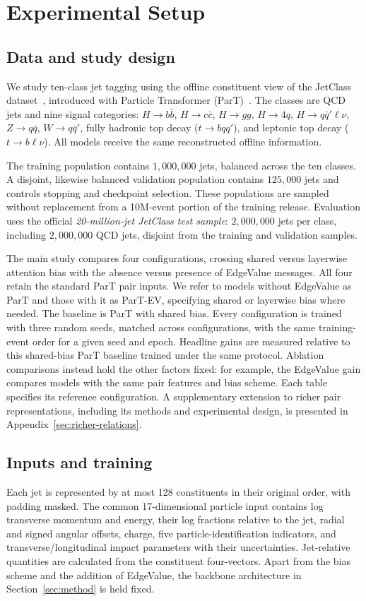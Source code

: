 \section{Experimental Setup}
\label{sec:experiments}

\subsection{Data and study design}
We study ten-class jet tagging using the offline constituent view of the
JetClass dataset~\citep{JetClass}, introduced with Particle Transformer
(ParT)~\citep{Qu2022ParticleTransformer}.
The classes are QCD jets and nine signal categories:
$H\to b\bar b$, $H\to c\bar c$, $H\to gg$, $H\to4q$, $H\to q\bar q'\ell\nu$,
$Z\to q\bar q$, $W\to q\bar q'$, fully hadronic top decay ($t\to bqq'$),
and leptonic top decay ($t\to b\ell\nu$).
All models receive the same reconstructed offline information.

The training population contains $1{,}000{,}000$ jets, balanced across the ten
classes. A disjoint, likewise balanced validation population contains
$125{,}000$ jets and controls stopping and checkpoint selection.
These populations are sampled without replacement from a 10M-event portion
of the training release. Evaluation uses the official
\emph{20-million-jet JetClass test sample}: $2{,}000{,}000$ jets per class, including
$2{,}000{,}000$ QCD jets, disjoint from the training and validation samples.

The main study compares four configurations, crossing shared versus layerwise
attention bias with the absence versus presence of EdgeValue messages.
All four retain the standard ParT pair inputs. We refer to models without
EdgeValue as ParT and those with it as ParT-EV, specifying shared or layerwise
bias where needed. The baseline is ParT with shared bias.
Every configuration is trained with three random seeds, matched across
configurations, with the same training-event order for a given seed and epoch.
Headline gains are measured relative to this shared-bias ParT baseline trained
under the same protocol. Ablation comparisons instead hold the other factors
fixed: for example, the EdgeValue gain compares models with the same pair
features and bias scheme. Each table specifies its reference configuration.
A supplementary extension to richer pair representations, including its
methods and experimental design, is presented in Appendix~\ref{sec:richer-relations}.

\subsection{Inputs and training}
\label{sec:training}
Each jet is represented by at most 128 constituents in their original order,
with padding masked. The common 17-dimensional particle input
contains log transverse momentum and energy, their log fractions relative to
the jet, radial and signed angular offsets, charge, five
particle-identification indicators, and transverse/longitudinal impact parameters
with their uncertainties. Jet-relative quantities are calculated from the
constituent four-vectors. Apart from the bias scheme and the addition of
EdgeValue, the backbone
architecture in Section~\ref{sec:method} is held fixed.

